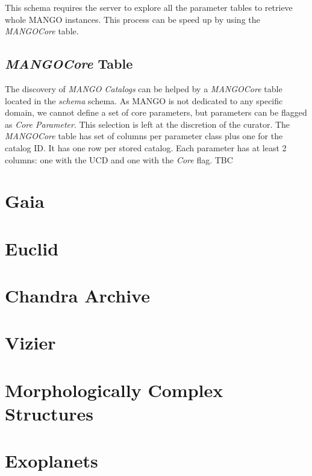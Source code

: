 \documentclass[11pt,a4paper]{ivoa}
\begin{document}
This schema requires the server to explore all the parameter tables to retrieve  whole MANGO instances.
This process can be speed up by using the \emph{MANGOCore} table.

\subsection{ \emph{MANGOCore} Table}

The discovery of \emph{MANGO Catalogs} can be helped by a  \emph{MANGOCore} table located in the  \emph{schema} schema. As MANGO is not dedicated to any specific domain, we cannot define a set of core parameters, but parameters can be flagged as \emph{Core Parameter}.
This selection is left at the discretion of the curator.
The \emph{MANGOCore} table has set of columns per parameter class plus one for the catalog ID.
It has one row per stored catalog. Each parameter has at least 2 columns: one with the UCD and one with the \emph{Core} flag. TBC


\appendix

\section{Gaia}


\section{Euclid}


\section{Chandra Archive}


\section{Vizier}


\section{Morphologically Complex Structures}


\section{Exoplanets}

\end{document}
